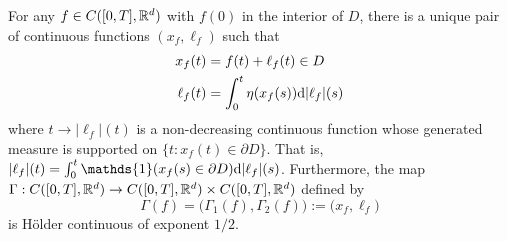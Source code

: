 \begin{lemma}\label{lemma:s_map}
	For any $f \in C([0, T], \mathbb{R}^d)$ with $f(0)$ in the interior of $D$, there is a unique pair of continuous functions $(x_f, \ell_f)$
	such that
	\begin{align}
		x_f(t) &= f(t) + \ell_f(t) \in {D}\label{eq:smap1}\\
		\ell_f(t) &= \int_0^t\eta(x_f(s)) \mathrm{d} |\ell_f|(s)\label{eq:smap2}
	\end{align}
	where $t \to |\ell_f|(t)$ is a non-decreasing continuous function whose generated measure is supported on 
	$\{t : x_f(t) \in \partial D\}.$ 
	That is, $|\ell_f|(t) = \int_0^t\mathds{1}(x_f(s) \in \partial D)\md |\ell_f|(s)$.
	Furthermore, the map $\Gamma : C([0, T], \mathbb{R}^d) \to C([0, T], \mathbb{R}^d) \times C([0, T], \mathbb{R}^d)$ defined by
	\[
	\Gamma(f) = \big(\Gamma_1(f), \Gamma_2(f)\big) := \big(x_f, \ell_f\big)
	\]
	is H\"{o}lder continuous of exponent $1/2$.
\end{lemma}

